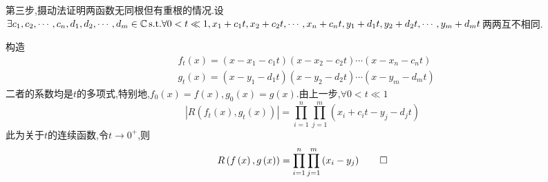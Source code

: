\begin{formal}
\begin{Proof}
第三步,摄动法证明两函数无同根但有重根的情况.设$\exists c_1,c_2,\cdots,c_n,d_1,d_2,\cdots,d_m\in\mathbb{C}\,\textup{s.t.}\forall 0<t\ll 1,x_1+c_1t,x_2+c_2t,\cdots,x_n+c_nt,y_1+d_1t,y_2+d_2t,\cdots,y_m+d_mt$两两互不相同.

构造
\begin{align*}
    &f_t\left(x\right)=\left(
        x-x_1-c_1t
    \right)\left(
        x-x_2-c_2t
    \right)\cdots\left(
        x-x_n-c_nt
    \right)\\
    &g_t\left(x\right)=\left(
        x-y_1-d_1t
    \right)\left(
        x-y_2-d_2t
    \right)\cdots\left(
        x-y_m-d_mt
    \right)    
\end{align*}
二者的系数均是$t$的多项式,特别地,$f_0\left(x\right)=f\left(x\right),g_0\left(x\right)=g\left(x\right)$.由上一步,$\forall 0<t\ll 1$
\[
\left|R\left(
    f_t\left(x\right),g_t\left(x\right)    
\right)\right|=\prod_{i=1}^{n}
\prod_{j=1}^{m}
\left(
    x_i+c_it-y_j-d_jt
\right)
\]
此为关于$t$的连续函数,令$t\to 0^+$,则
\[
R\left(f\left(x\right),g\left(x\right)\right)=\prod_{i=1}^{n}
\prod_{j=1}^{m}
\left(
    x_i-y_j
\right)\qedhere
\]
\end{Proof}
\end{formal}

